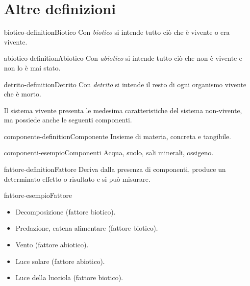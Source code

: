 \documentclass[preview]{standalone}
\begin{document}
\section{Altre definizioni}

\begin{snippetdefinition}{biotico-definition}{Biotico}
    Con \textit{biotico} si intende tutto ciò che è vivente o era vivente.
\end{snippetdefinition}

\begin{snippetdefinition}{abiotico-definition}{Abiotico}
    Con \textit{abiotico} si intende tutto ciò che non è vivente e non lo è mai stato.
\end{snippetdefinition}

\begin{snippetdefinition}{detrito-definition}{Detrito}
    Con \textit{detrito} si intende il resto di ogni organismo vivente che è morto.
\end{snippetdefinition}

\begin{plainhtml}
    Il sistema vivente presenta le medesima caratteristiche del sistema non-vivente,
    ma possiede anche le seguenti componenti.
\end{plainhtml}

\begin{snippetdefinition}{componente-definition}{Componente}
    Insieme di materia, concreta e tangibile.
\end{snippetdefinition}

\begin{snippetexample}{componenti-esempio}{Componenti}
    Acqua, suolo, sali minerali, ossigeno.
\end{snippetexample}

\begin{snippetdefinition}{fattore-definition}{Fattore}
    Deriva dalla presenza di componenti, produce un determinato effetto o risultato e si può misurare.
\end{snippetdefinition}

\begin{snippetexample}{fattore-esempio}{Fattore}
    \begin{itemize}
        \item Decomposizione (fattore biotico).
        \item Predazione, catena alimentare (fattore biotico).
        \item Vento (fattore abiotico).
        \item Luce solare (fattore abiotico).
        \item Luce della lucciola (fattore biotico).
    \end{itemize}
\end{snippetexample}
\end{document}
